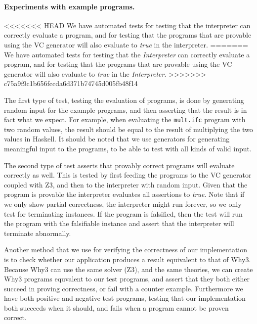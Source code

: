 \paragraph{Experiments with example programs.}
<<<<<<< HEAD
We have automated tests for testing that the interpreter can correctly evaluate a program,
and for testing that the programs that are provable using the VC generator will also evaluate to \textit{true} in the interpreter.
=======
We have automated tests for testing that the \textit{Interpreter} can correctly evaluate a program,
and for testing that the programs that are provable using the VC generator will also evaluate to \textit{true} in the \textit{Interpreter}.
>>>>>>> c75a9f9c1b656fccda6d371b74745d005fb48f14

The first type of test, testing the evaluation of programs, is done by generating random input for the example programs, and then asserting that the result is in fact what we expect.
For example, when evaluating the \texttt{mult.ifc} program with two random values, the result should be equal to the result of multiplying the two values in Haskell.
It should be noted that we use generators for generating meaningful input to the programs, to be able to test with all kinds of valid input.

The second type of test asserts that provably correct programs will evaluate correctly as well.
This is tested by first feeding the programs to the VC generator coupled with Z3, and then to the interpreter with random input.
Given that the program is provable the interpreter evaluates all assertions to \textit{true}.
Note that if we only show partial correctness, the interpreter might run forever, so we only test for terminating instances.
If the program is falsified, then the test will run the program with the falsifiable instance and assert that the interpreter will terminate abnormally.

Another method that we use for verifying the correctness of our implementation is to check whether our application produces a result equivalent to that of Why3.
Because Why3 can use the same solver (Z3), and the same theories, we can create Why3 programs equvalent to our test programs, and assert that they both either succeed in proving correctness, or fail with a counter example.
Furthermore we have both positive and negative test programs, testing that our implementation both succeeds when it should, and fails when a program cannot be proven correct.

